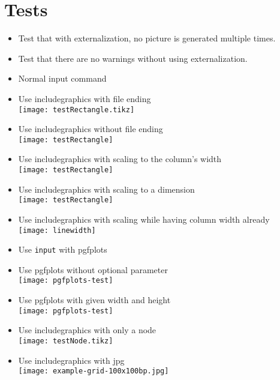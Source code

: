 \documentclass[twocolumn]{article}
\begin{document}
	\section*{Tests}
	\begin{itemize}
		\item Test that with externalization, no picture is generated multiple times.
		\item Test that there are no warnings without using externalization.
		\item Normal input command\\%
		\item Use includegraphics with file ending\\%
			\texttt{[image: testRectangle.tikz]}%
		\item Use includegraphics without file ending\\%
			\texttt{[image: testRectangle]}%
		\item Use includegraphics with scaling to the column's width\\%
			\texttt{[image: testRectangle]}%
		\item Use includegraphics with scaling to a dimension\\%
			\texttt{[image: testRectangle]}%
		\item Use includegraphics with scaling while having column width already\\%
			\texttt{[image: linewidth]}%
		\item Use \texttt{input} with pgfplots\\%
		\item Use pgfplots without optional parameter\\%
			\texttt{[image: pgfplots-test]}%
		\item Use pgfplots with given width and height\\%
			\texttt{[image: pgfplots-test]}%
		\item Use includegraphics with only a node\\%
			\texttt{[image: testNode.tikz]}%
		\ifpdf
			\item Use includegraphics with jpg\\%
				\texttt{[image: example-grid-100x100bp.jpg]}%

\end{itemize}
\end{document}
